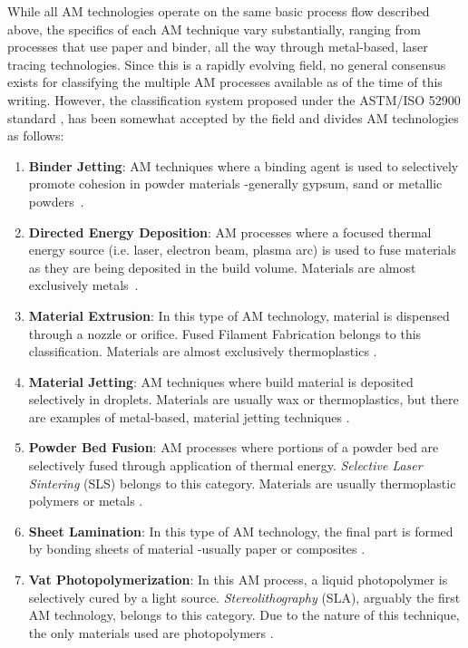 \documentclass[main.tex]{subfiles}
\begin{document}
While all AM technologies operate on the same basic process flow described above, the specifics of each AM technique vary substantially, ranging from processes that use paper and binder, all the way through metal-based, laser tracing technologies. Since this is a rapidly evolving field, no general consensus exists for classifying the multiple AM processes available as of the time of this writing. However, the classification system proposed under the ASTM/ISO 52900 standard \cite{ASTM52900}, has been somewhat accepted by the field and divides AM technologies as follows:
\begin{enumerate}
	\item \textbf{Binder Jetting}: AM techniques where a binding agent is used to selectively promote cohesion in powder materials -generally gypsum, sand or metallic powders~\cite{ASTM52900,3DHubs2018}.
	\item \textbf{Directed Energy Deposition}: AM processes where a focused thermal energy source (i.e. laser, electron beam, plasma arc) is used to fuse materials as they are being deposited in the build volume. Materials are almost exclusively metals~\cite{ASTM52900,3DHubs2018}.
	\item \textbf{Material Extrusion}: In this type of AM technology, material is dispensed through a nozzle or orifice. Fused Filament Fabrication belongs to this classification. Materials are almost exclusively thermoplastics \cite{ASTM52900,3DHubs2018}.
	\item \textbf{Material Jetting}: AM techniques where build material is deposited selectively in droplets. Materials are usually wax or thermoplastics, but there are examples of metal-based, material jetting techniques \cite{ASTM52900,3DHubs2018}.
	\item \textbf{Powder Bed Fusion}: AM processes where portions of a powder bed are selectively fused through application of thermal energy. \emph{Selective Laser Sintering} (SLS) belongs to this category. Materials are usually thermoplastic polymers or metals \cite{ASTM52900,3DHubs2018}. 
	\item \textbf{Sheet Lamination}: In this type of AM technology, the final part is formed by bonding sheets of material -usually paper or composites \cite{ASTM52900,3DHubs2018}. 
	\item \textbf{Vat Photopolymerization}: In this AM process, a liquid photopolymer is selectively cured by a light source. \emph{Stereolithography} (SLA), arguably the first AM technology, belongs to this category. Due to the nature of this technique, the only materials used are photopolymers \cite{ASTM52900,3DHubs2018}.
\end{enumerate} 
\end{document}
